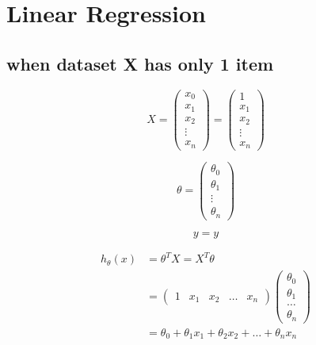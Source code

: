 \section{Linear Regression}
\subsection{when dataset X has only 1 item}

\begin{equation}
X = \left(\begin{matrix}
		x_0 \\ x_1 \\ x_2 \\ \vdots \\ x_n
	\end{matrix}\right)
= \left(\begin{matrix}
		1 \\ x_1 \\ x_2 \\ \vdots \\ x_n
	\end{matrix}\right)
\end{equation}


\begin{equation}
\theta = \left(\begin{matrix}
		\theta_0 \\ \theta_1 \\ \vdots \\ \theta_n
	\end{matrix}\right)
\end{equation}


\begin{equation}
y = y
\end{equation}


\begin{equation}
\begin{aligned}
h_\theta(x) & = \theta^{T}X = X^T\theta \\
& = \left( \begin{matrix}
		1 & x_1 & x_2 & \dots & x_n
	\end{matrix}\right)
	\left(\begin{matrix}
		\theta_0 \\
		\theta_1 \\
		\dots \\
		\theta_n
	\end{matrix}\right) \\
& = \theta_0 + \theta_1x_1 + \theta_2x_2 + \dots + \theta_nx_n
\end{aligned}
\end{equation}




